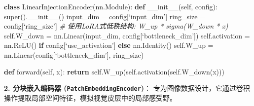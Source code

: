 \documentclass[
  12pt,
]{article}
\newenvironment{Shaded}{}{}
\newcommand{\BuiltInTok}[1]{#1}
\newcommand{\CommentTok}[1]{\textcolor[rgb]{0.38,0.63,0.69}{\textit{#1}}}
\newcommand{\ControlFlowTok}[1]{\textcolor[rgb]{0.00,0.44,0.13}{\textbf{#1}}}
\newcommand{\FunctionTok}[1]{\textcolor[rgb]{0.02,0.16,0.49}{#1}}
\newcommand{\KeywordTok}[1]{\textcolor[rgb]{0.00,0.44,0.13}{\textbf{#1}}}
\newcommand{\NormalTok}[1]{#1}
\newcommand{\OperatorTok}[1]{\textcolor[rgb]{0.40,0.40,0.40}{#1}}
\newcommand{\VariableTok}[1]{\textcolor[rgb]{0.10,0.09,0.49}{#1}}
\begin{document}
\begin{Shaded}
\begin{Highlighting}[]
\KeywordTok{class}\NormalTok{ LinearInjectionEncoder(nn.Module):}
    \KeywordTok{def} \FunctionTok{\_\_init\_\_}\NormalTok{(}\VariableTok{self}\NormalTok{, config):}
        \BuiltInTok{super}\NormalTok{().}\FunctionTok{\_\_init\_\_}\NormalTok{()}
\NormalTok{        input\_dim }\OperatorTok{=}\NormalTok{ config[‘input\_dim’]}
\NormalTok{        ring\_size }\OperatorTok{=}\NormalTok{ config[‘ring\_size’]}
        \CommentTok{\# 使用LoRA式低秩结构: W\_up * sigma(W\_down * x)}
        \VariableTok{self}\NormalTok{.W\_down }\OperatorTok{=}\NormalTok{ nn.Linear(input\_dim, config[‘bottleneck\_dim’])}
        \VariableTok{self}\NormalTok{.activation }\OperatorTok{=}\NormalTok{ nn.ReLU() }\ControlFlowTok{if}\NormalTok{ config[‘use\_activation’] }\ControlFlowTok{else}\NormalTok{ nn.Identity()}
        \VariableTok{self}\NormalTok{.W\_up }\OperatorTok{=}\NormalTok{ nn.Linear(config[‘bottleneck\_dim’], ring\_size)}
        
    \KeywordTok{def}\NormalTok{ forward(}\VariableTok{self}\NormalTok{, x):}
        \ControlFlowTok{return} \VariableTok{self}\NormalTok{.W\_up(}\VariableTok{self}\NormalTok{.activation(}\VariableTok{self}\NormalTok{.W\_down(x)))}
\end{Highlighting}
\end{Shaded}

\textbf{2. 分块嵌入编码器 (\texttt{PatchEmbeddingEncoder})}：
专为图像数据设计，它通过卷积操作提取局部空间特征，模拟视觉皮层中的局部感受野。
\end{document}

